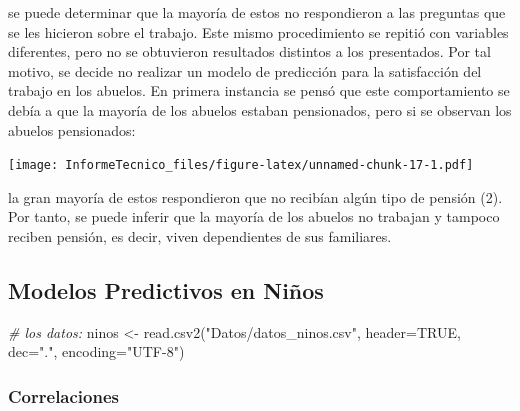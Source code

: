 \documentclass[
]{article}
\newenvironment{Shaded}{\begin{snugshade}}{\end{snugshade}}
\newcommand{\AttributeTok}[1]{\textcolor[rgb]{0.77,0.63,0.00}{#1}}
\newcommand{\CommentTok}[1]{\textcolor[rgb]{0.56,0.35,0.01}{\textit{#1}}}
\newcommand{\ConstantTok}[1]{\textcolor[rgb]{0.00,0.00,0.00}{#1}}
\newcommand{\FunctionTok}[1]{\textcolor[rgb]{0.00,0.00,0.00}{#1}}
\newcommand{\NormalTok}[1]{#1}
\newcommand{\OtherTok}[1]{\textcolor[rgb]{0.56,0.35,0.01}{#1}}
\newcommand{\StringTok}[1]{\textcolor[rgb]{0.31,0.60,0.02}{#1}}
\begin{document}
se puede determinar que la mayoría de estos no respondieron a las
preguntas que se les hicieron sobre el trabajo. Este mismo procedimiento
se repitió con variables diferentes, pero no se obtuvieron resultados
distintos a los presentados. Por tal motivo, se decide no realizar un
modelo de predicción para la satisfacción del trabajo en los abuelos. En
primera instancia se pensó que este comportamiento se debía a que la
mayoría de los abuelos estaban pensionados, pero si se observan los
abuelos pensionados:

\texttt{[image: InformeTecnico\_files/figure-latex/unnamed-chunk-17-1.pdf]}

la gran mayoría de estos respondieron que no recibían algún tipo de
pensión (2). Por tanto, se puede inferir que la mayoría de los abuelos
no trabajan y tampoco reciben pensión, es decir, viven dependientes de
sus familiares.

\hypertarget{modelos-predictivos-en-niuxf1os}{%
\subsection{Modelos Predictivos en
Niños}\label{modelos-predictivos-en-niuxf1os}}

\begin{Shaded}
\begin{Highlighting}[]
\CommentTok{\# los datos:}
\NormalTok{ninos }\OtherTok{\textless{}{-}} \FunctionTok{read.csv2}\NormalTok{(}\StringTok{"Datos/datos\_ninos.csv"}\NormalTok{, }\AttributeTok{header=}\ConstantTok{TRUE}\NormalTok{, }\AttributeTok{dec=}\StringTok{"."}\NormalTok{, }\AttributeTok{encoding=}\StringTok{"UTF{-}8"}\NormalTok{)}
\end{Highlighting}
\end{Shaded}

\hypertarget{correlaciones}{%
\subsubsection{Correlaciones}\label{correlaciones}}
\end{document}
